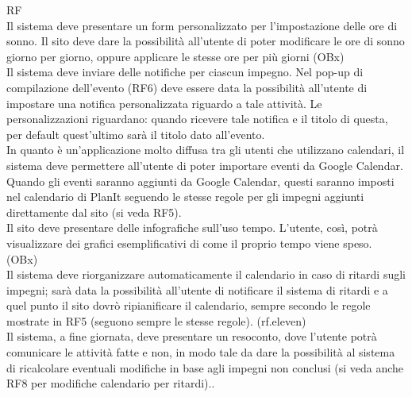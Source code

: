\begin {mylist} {RF}
     \\
    Il sistema deve presentare un form personalizzato per l'impostazione delle ore
    di sonno. Il sito deve dare la possibilità all'utente di poter modificare le ore 
    di sonno giorno per giorno, oppure applicare le stesse ore per più giorni (OBx)
     \\
    Il sistema deve inviare delle notifiche per ciascun impegno. Nel pop-up
    di compilazione dell'evento (RF6) deve essere data la possibilità all'utente
    di impostare una notifica personalizzata riguardo a tale attività.
    Le personalizzazioni riguardano: quando ricevere tale notifica e il titolo di questa, per 
    default quest'ultimo sarà il titolo dato all'evento.
     \\
    In quanto è un'applicazione molto diffusa tra gli utenti che utilizzano calendari,
    il sistema deve permettere all'utente di poter importare eventi da Google Calendar. 
    Quando gli eventi saranno aggiunti da Google Calendar, questi saranno
    imposti nel calendario di PlanIt seguendo le stesse regole per gli impegni 
    aggiunti direttamente dal sito (si veda RF5).
     \\
    Il sito deve presentare delle infografiche sull'uso tempo. L'utente, così, potrà
    visualizzare dei grafici esemplificativi di come il proprio tempo viene speso. 
    (OBx)
     \\
    Il sistema deve riorganizzare automaticamente il calendario in caso di ritardi sugli 
    impegni; sarà data la possibilità all'utente di notificare il sistema di ritardi e 
    a quel punto il sito dovrò ripianificare il calendario, sempre secondo le regole mostrate
    in RF5 (seguono sempre le stesse regole).  
    \requisitiLink(rf.eleven) \\
    Il sistema, a fine giornata, deve presentare un resoconto, dove l'utente potrà
    comunicare le attività fatte e non, in modo tale da dare la possibilità al sistema di 
    ricalcolare eventuali modifiche in base agli impegni non conclusi (si veda
    anche RF8 per modifiche calendario per ritardi)..
    



\end{mylist}